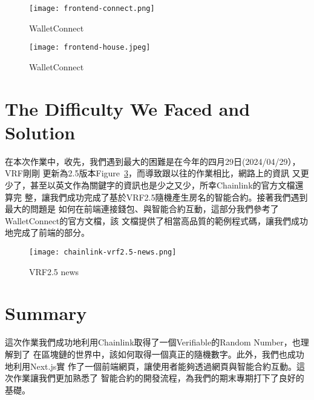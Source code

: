 \begin{figure}[H]
    \centering
    \texttt{[image: frontend-connect.png]}
    \caption{WalletConnect}
    \label{fig:frontend-connect}
\end{figure}


\begin{figure}[H]
    \centering
    \texttt{[image: frontend-house.jpeg]}
    \caption{WalletConnect}
    \label{fig:demo}
\end{figure}


\section{The Difficulty We Faced and Solution}

在本次作業中，收先，我們遇到最大的困難是在今年的四月29日(2024/04/29），VRF剛剛
更新為2.5版本Figure~\ref{fig:vrf2.5-news}，而導致跟以往的作業相比，網路上的資訊
又更少了，甚至以英文作為關鍵字的資訊也是少之又少，所幸Chainlink的官方文檔還算完
整，讓我們成功完成了基於VRF2.5隨機產生房名的智能合約。接著我們遇到最大的問題是
如何在前端連接錢包、與智能合約互動，這部分我們參考了WalletConnect的官方文檔，該
文檔提供了相當高品質的範例程式碼，讓我們成功地完成了前端的部分。

\begin{figure}[H]
    \centering
    \texttt{[image: chainlink-vrf2.5-news.png]}
    \caption{VRF2.5 news}
    \label{fig:vrf2.5-news}
\end{figure}

\section{Summary}

這次作業我們成功地利用Chainlink取得了一個Verifiable的Random Number，也理解到了
在區塊鏈的世界中，該如何取得一個真正的隨機數字。此外，我們也成功地利用Next.js實
作了一個前端網頁，讓使用者能夠透過網頁與智能合約互動。這次作業讓我們更加熟悉了
智能合約的開發流程，為我們的期末專期打下了良好的基礎。

